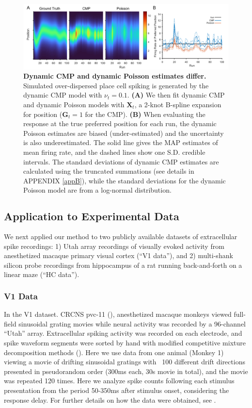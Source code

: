 \documentclass[]{article}
\begin{document}
	\begin{figure}[h!]
		\centering
		\includegraphics[width=1\textwidth]{figure3.png}
		\caption{\textbf{Dynamic CMP and dynamic Poisson estimates differ.} Simulated over-dispersed place cell spiking is generated by the dynamic CMP model with $\nu_t = 0.1$. \textbf{(A)} We then fit dynamic CMP and dynamic Poisson models with $\bm{X}_t$, a 2-knot B-spline expansion for position ($\bm{G}_t = 1$ for the CMP). \textbf{(B)} When evaluating the response at the true preferred position for each run, the dynamic Poisson estimates are biased (under-estimated) and the uncertainty is also underestimated. The solid line gives the MAP estimates of mean firing rate, and the dashed lines show one S.D. credible intervals. The standard deviations of dynamic CMP estimates are calculated using the truncated summations (see details in APPENDIX \ref{appB}), while the standard deviations for the dynamic Poisson model are from a log-normal distribution.}
		\label{fig3}
	\end{figure}
	
	\subsection{Application to Experimental Data}
	We next applied our method to two publicly available datasets of extracellular spike recordings: 1) Utah array recordings of visually evoked activity from anesthetized macaque primary visual cortex (“V1 data”), and 2) multi-shank silicon probe recordings from hippocampus of a rat running back-and-forth on a linear maze (“HC data”).
	
	\subsubsection{V1 Data}
	In the V1 dataset. CRCNS pvc-11 (\cite{Kohn2016}), anesthetized macaque monkeys viewed full-field sinusoidal grating movies while neural activity was recorded by a 96-channel “Utah” array. Extracellular spiking activity was recorded on each electrode, and spike waveform segments were sorted by hand with modified competitive mixture decomposition methods (\cite{Shoham2003}). Here we use data from one animal (Monkey 1) viewing a movie of drifting sinusoidal gratings with ~100 different drift directions presented in pseudorandom order (300ms each, 30s movie in total), and the movie was repeated 120 times. Here we analyze spike counts following each stimulus presentation from the period 50-350ms after stimulus onset, considering the response delay. For further details on how the data were obtained, see \cite{Kelly2010,Smith2008}.
	
\end{document}
